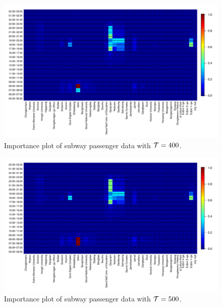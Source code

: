 \documentclass[preprint, review, 12pt]{article}
\theoremstyle{definition}
\theoremstyle{remark}
\begin{document}
\begin{figure}
	\centering
	\includegraphics[width=1.05\textwidth]{Fig/In_scale_5.pdf}
	\vspace{-13mm}
	\caption{Importance plot of subway passenger data with ${\cal T}=400$.}
	\label{snow:subway_in_4}
\end{figure}	

\begin{figure}
	\centering
	\includegraphics[width=1.05\textwidth]{Fig/In_scale_6.pdf}
	\vspace{-13mm}
	\caption{Importance plot of subway passenger data with ${\cal T}=500$.}
	\label{snow:subway_in_5}
\end{figure}	
\end{document}
